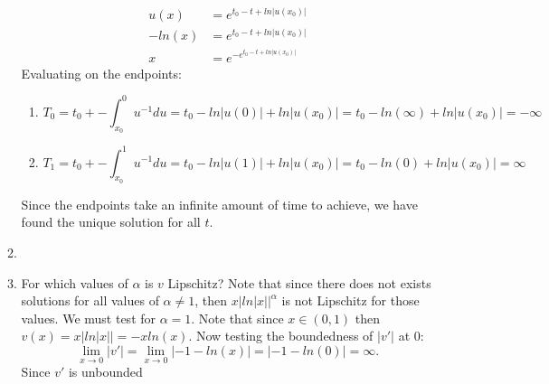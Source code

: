 \documentclass[12pt, letterpaper]{article}
\begin{document}
\begin{enumerate}
\begin{enumerate}
\begin{align*}
				u(x) &= e^{t_0 -t + ln|u(x_0)|}\\
				-ln(x) &= e^{t_0 -t + ln|u(x_0)|}\\
				x &= e^{-e^{t_0 -t + ln|u(x_0)|}}				
			\end{align*}
			Evaluating on the endpoints:
			\begin{enumerate}
				\item $$T_0 = t_0 + -\int_{x_0}^0 u^{-1}du = t_0 - ln|u(0)| + ln|u(x_0)| = t_0 - ln(\infty) + ln|u(x_0)| = -\infty$$
				\item $$T_1 = t_0 + -\int_{x_0}^1 u^{-1}du = t_0 - ln|u(1)| + ln|u(x_0)| = t_0 - ln(0) + ln|u(x_0)|= \infty$$
			\end{enumerate}
			Since the endpoints take an infinite amount of time to achieve, we have found the unique solution for all $t$.
			\iffalse
			However, if $\alpha > 1$, by the equation we got via barrows formula, then $1-\alpha = k < 1$.  Since $k$ is negative, then $u(0)^k = (-ln(0))^k = \infty^k = 0$, therefore: 
			\begin{equation*}
				t_0 + -\int_{x_0}^0 u^{-\alpha} = t_0 + \frac{-1}{k}(u(0)^{k}-u(x_0)^{k}) = t_0 + \frac{u(x_0)^{k}}{k} < \infty
			\end{equation*}
			On the other hand										
			\fi
			\item
			\item For which values of $\alpha$ is $v$ Lipschitz? 	Note that since there does not exists solutions for all values of $\alpha \neq 1$, then $x|ln|x||^\alpha$ is not Lipschitz for those values.  We must test for $\alpha = 1$.  Note that since $x \in (0,1)$ then $v(x) = x|ln|x||= -x ln(x)$.  Now testing the boundedness of $|v'|$ at $0$:
			\begin{equation*}
				\lim_{x \to 0} |v'| =\lim_{x \to 0} |-1-ln(x)| = |-1-ln(0)|  = \infty.
			\end{equation*}
			Since $v'$ is unbounded
		\end{enumerate}
\end{enumerate}
\end{document}
